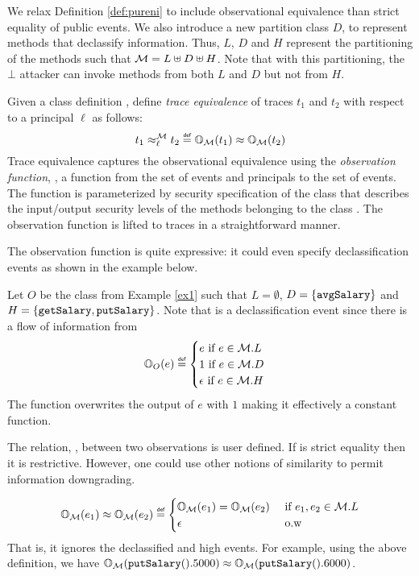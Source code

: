 \documentclass[acmsmall,screen,review, nonacm]{acmart}
\begin{document}
We relax Definition \ref{def:pureni} to include observational equivalence  than strict equality of public events.
We also introduce a new partition class $D$, to represent methods that declassify information. Thus, $L$, $D$ and $H$ represent the partitioning of the methods such that $\classpart = L \uplus D \uplus H$.
Note that with this partitioning, the $\bot$ attacker can invoke methods from both $L$ and $D$ but not from $H$.

Given a class definition \classpart, define \emph{trace equivalence} of traces $t_1$ and $t_2$ with respect to a principal $\ell$ as follows:
\[
\treq{t_1}{t_2}{\ell}{\classpart} \isdef \ob{t_1}{\classpart}{\ell} \obsim \ob{t_2}{\classpart}{\ell}
\]
Trace equivalence captures the  observational equivalence using the \emph{observation function}, , a function from the set of events and  principals to the set of events.
The function is parameterized by security specification of the class that describes the input/output security levels of the methods belonging to the class \classpart.
The observation function is lifted to traces in a straightforward manner.


The observation function is quite expressive: it could even specify declassification events as shown in the example below.

\begin{example}
  Let $O$ be the class from Example \ref{ex1} such that  $L = \emptyset $, $D = \{ \mycode{avgSalary} \}$ and $H = \{\mycode{getSalary}, \mycode{putSalary} \}$.
  Note that  is a declassification event since there is a flow of information from 
  \[
  \ob{e}{O}{L} \isdef \begin{cases}
    e \mbox{ if } e \in \classpart.L \\
    1 \mbox{ if } e \in \classpart.D \\
    \emptytr \mbox{ if } e \in \classpart.H
  \end{cases}
  \]
  The function overwrites the output of $e$ with $1$ making it effectively a constant function.
\end{example}

The relation, \obsim, between two observations is user defined. If \obsim is strict equality then it is  restrictive. However, one could use other notions of similarity to permit information downgrading.

\begin{example}
  \[
  \ob{e_1}{\classpart}{L} \obsim \ob{e_2}{\classpart}{L} \isdef \begin{cases}
    \ob{e_1}{\classpart}{L} = \ob{e_2}{\classpart}{L} &\mbox{ if } e_1, e_2 \in \classpart.L \\
    \emptytr &\mbox{ o.w }
  \end{cases}
  \]
  That is, it ignores the declassified and high events. For example, using the above definition, we have $\ob{\mycode{putSalary}().5000}{\classpart}{L} \obsim \ob{\mycode{putSalary}().6000}{\classpart}{L}$.
\end{example}
\end{document}
